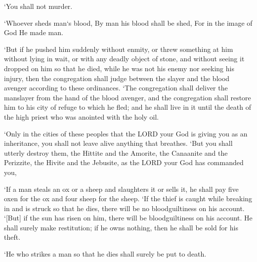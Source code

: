 \begin{scripture}[Exodus 20:13]
    `You shall not murder.
\end{scripture}

\begin{scripture}[Genesis 9:6]
    `Whoever sheds man`s blood, By man his blood shall be shed, For in the image of God He made man.
\end{scripture}

\begin{scripture}[Numbers 35:22-25]
    `But if he pushed him suddenly without enmity, or threw something at him without lying in wait,
    or with any deadly object of stone, and without seeing it dropped on him so that he died, while he was not his enemy nor seeking his injury,
    then the congregation shall judge between the slayer and the blood avenger according to these ordinances.
    `The congregation shall deliver the manslayer from the hand of the blood avenger, and the congregation shall restore him to his city of refuge to which he fled; and he shall live in it until the death of the high priest who was anointed with the holy oil.
\end{scripture}

\begin{scripture}[Deuteronomy 20:16-17]
    `Only in the cities of these peoples that the LORD your God is giving you as an inheritance, you shall not leave alive anything that breathes.
    `But you shall utterly destroy them, the Hittite and the Amorite, the Canaanite and the Perizzite, the Hivite and the Jebusite, as the LORD your God has commanded you,
\end{scripture}

\begin{scripture}[Exodus 22:1-3]
    `If a man steals an ox or a sheep and slaughters it or sells it, he shall pay five oxen for the ox and four sheep for the sheep.
    `If the thief is caught while breaking in and is struck so that he dies, there will be no bloodguiltiness on his account.
    `[But] if the sun has risen on him, there will be bloodguiltiness on his account. He shall surely make restitution; if he owns nothing, then he shall be sold for his theft.
\end{scripture}

\begin{scripture}[Exodus 21:12]
    `He who strikes a man so that he dies shall surely be put to death.
\end{scripture}

